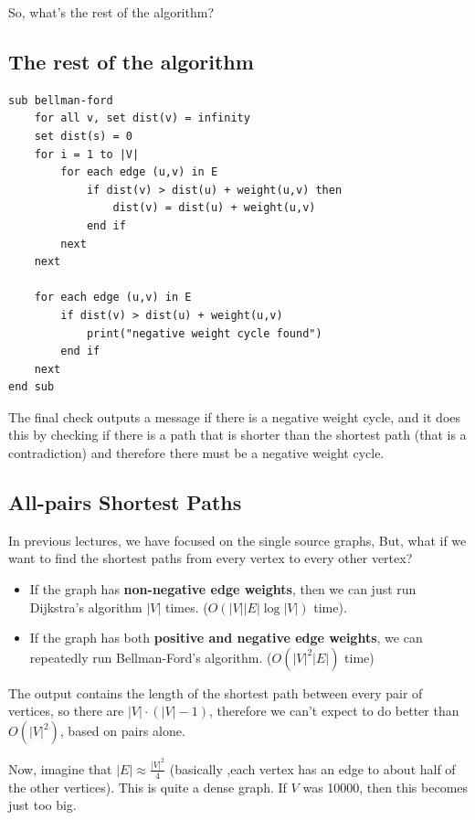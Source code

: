 \documentclass[11pt,a4paper,titlepage,dvipsnames,cmyk]{scrartcl}
\begin{document}
So, what's the rest of the algorithm?

\subsection{The rest of the algorithm}%
\label{sub:rest-of-alg}

\begin{lstlisting}
sub bellman-ford
    for all v, set dist(v) = infinity
    set dist(s) = 0
    for i = 1 to |V|
        for each edge (u,v) in E
            if dist(v) > dist(u) + weight(u,v) then
                dist(v) = dist(u) + weight(u,v)
            end if
        next
    next

    for each edge (u,v) in E
        if dist(v) > dist(u) + weight(u,v)
            print("negative weight cycle found")
        end if
    next
end sub
\end{lstlisting}

The final check outputs a message if there is a negative weight cycle, and
it does this by checking if there is a path that is shorter than the
shortest path (that is a contradiction) and therefore there must be a
negative weight cycle.

\newpage
\subsection{All-pairs Shortest Paths}%
\label{sub:all-pairs-shortest}
In previous lectures, we have focused on the single source graphs, But,
what if we want to find the shortest paths from every vertex to every other
vertex?

\begin{itemize}
    \item If the graph has \textbf{non-negative edge weights}, then we can
        just run Dijkstra's algorithm $|V|$ times. ($O(|V||E|\log|V|)$
        time).
    \item If the graph has both \textbf{positive and negative edge
        weights}, we can repeatedly run Bellman-Ford's algorithm.
        ($O(|V|^2|E|)$ time)
\end{itemize}

The output contains the length of the shortest path between every pair of
vertices, so there are $|V| \cdot (|V|-1)$, therefore we can't expect to
do better than $O(|V|^2)$, based on pairs alone.

Now, imagine that $|E| \approx \frac{|V|^2}{4}$ (basically ,each vertex
has an edge to about half of the other vertices). This is quite a dense
graph. If $V$ was 10000, then this becomes just too big.
\end{document}
